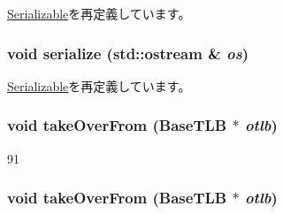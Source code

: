 \hyperlink{classSerializable_ad6272f80ae37e8331e3969b3f072a801}{Serializable}を再定義しています。\hypertarget{classMipsISA_1_1TLB_a53e036786d17361be4c7320d39c99b84}{
\subsubsection[{serialize}]{\setlength{\rightskip}{0pt plus 5cm}void serialize (std::ostream \& {\em os})}}
\label{classMipsISA_1_1TLB_a53e036786d17361be4c7320d39c99b84}


\hyperlink{classSerializable_ad6272f80ae37e8331e3969b3f072a801}{Serializable}を再定義しています。\hypertarget{classMipsISA_1_1TLB_a15b6c15c1be2ca4de3e65772a02aa29f}{
\subsubsection[{takeOverFrom}]{\setlength{\rightskip}{0pt plus 5cm}void takeOverFrom ({\bf BaseTLB} $\ast$ {\em otlb})}}
\label{classMipsISA_1_1TLB_a15b6c15c1be2ca4de3e65772a02aa29f}



\begin{DoxyCode}
91 {}
\end{DoxyCode}
\hypertarget{classMipsISA_1_1TLB_a15b6c15c1be2ca4de3e65772a02aa29f}{
\subsubsection[{takeOverFrom}]{\setlength{\rightskip}{0pt plus 5cm}void takeOverFrom ({\bf BaseTLB} $\ast$ {\em otlb})}}
\label{classMipsISA_1_1TLB_a15b6c15c1be2ca4de3e65772a02aa29f}



